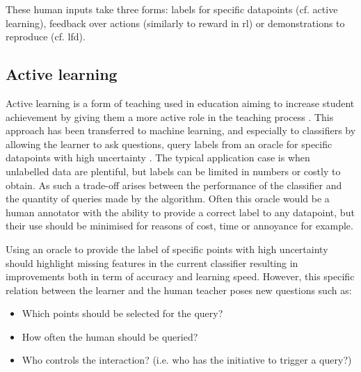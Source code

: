 These human inputs take three forms: labels for specific datapoints (cf. active learning), feedback over actions (similarly to reward in \gls{rl}) or demonstrations to reproduce (cf. \gls{lfd}).

\subsection{Active learning} \label{ssec:back_active}

Active learning is a form of teaching used in education aiming to increase student achievement by giving them a more active role in the teaching process \citep{johnson1991active}. This approach has been transferred to machine learning, and especially to classifiers by allowing the learner to ask questions, query labels from an oracle for specific datapoints with high uncertainty \citep{settles2012active}. The typical application case is when unlabelled data are plentiful, but labels can be limited in numbers or costly to obtain. As such a trade-off arises between the performance of the classifier and the quantity of queries made by the algorithm. Often this oracle would be a human annotator with the ability to provide a correct label to any datapoint, but their use should be minimised for reasons of cost, time or annoyance for example.

Using an oracle to provide the label of specific points with high uncertainty should highlight missing features in the current classifier resulting in improvements both in term of accuracy and learning speed. However, this specific relation between the learner and the human teacher poses new questions such as: 
\begin{itemize}
	\item Which points should be selected for the query?
	\item How often the human should be queried?
	\item Who controls the interaction? (i.e. who has the initiative to trigger a query?)
\end{itemize}

